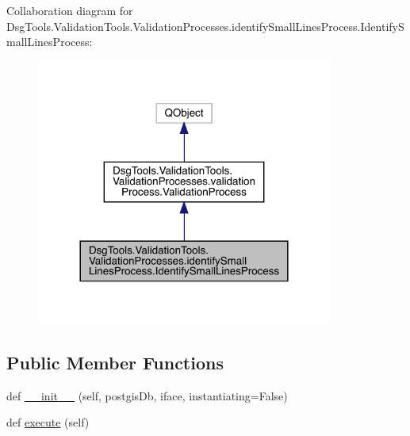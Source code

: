 Collaboration diagram for Dsg\+Tools.\+Validation\+Tools.\+Validation\+Processes.\+identify\+Small\+Lines\+Process.\+Identify\+Small\+Lines\+Process\+:
\nopagebreak
\begin{figure}[H]
\begin{center}
\leavevmode
\includegraphics[width=276pt]{class_dsg_tools_1_1_validation_tools_1_1_validation_processes_1_1identify_small_lines_process_1_caaeb46dbaa99c4b8d68cfb79787a332}
\end{center}
\end{figure}
\subsection*{Public Member Functions}
\begin{DoxyCompactItemize}
\item 
def \mbox{\hyperlink{class_dsg_tools_1_1_validation_tools_1_1_validation_processes_1_1identify_small_lines_process_1_1_identify_small_lines_process_aa6ca14f3af8ba54fb7fc270b24ead40b}{\+\_\+\+\_\+init\+\_\+\+\_\+}} (self, postgis\+Db, iface, instantiating=False)
\item 
def \mbox{\hyperlink{class_dsg_tools_1_1_validation_tools_1_1_validation_processes_1_1identify_small_lines_process_1_1_identify_small_lines_process_a743a9e6cc2e65c5b0b2c990370c06969}{execute}} (self)
\end{DoxyCompactItemize}
